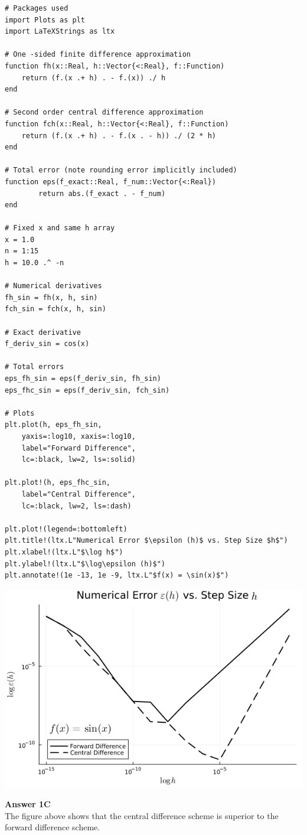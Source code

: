\documentclass{article}
\begin{document}
\begin{verbatim}
# Packages used
import Plots as plt
import LaTeXStrings as ltx

# One -sided finite difference approximation
function fh(x::Real, h::Vector{<:Real}, f::Function)
    return (f.(x .+ h) . - f.(x)) ./ h
end

# Second order central difference approximation
function fch(x::Real, h::Vector{<:Real}, f::Function)
    return (f.(x .+ h) . - f.(x . - h)) ./ (2 * h)
end

# Total error (note rounding error implicitly included)
function eps(f_exact::Real, f_num::Vector{<:Real})
        return abs.(f_exact . - f_num)
end

# Fixed x and same h array
x = 1.0
n = 1:15
h = 10.0 .^ -n

# Numerical derivatives
fh_sin = fh(x, h, sin)
fch_sin = fch(x, h, sin)

# Exact derivative
f_deriv_sin = cos(x)

# Total errors
eps_fh_sin = eps(f_deriv_sin, fh_sin)
eps_fhc_sin = eps(f_deriv_sin, fch_sin)

# Plots
plt.plot(h, eps_fh_sin,
    yaxis=:log10, xaxis=:log10,
    label="Forward Difference",
    lc=:black, lw=2, ls=:solid)

plt.plot!(h, eps_fhc_sin,
    label="Central Difference",
    lc=:black, lw=2, ls=:dash)

plt.plot!(legend=:bottomleft)
plt.title!(ltx.L"Numerical Error $\epsilon (h)$ vs. Step Size $h$")
plt.xlabel!(ltx.L"$\log h$")
plt.ylabel!(ltx.L"$\log\epsilon (h)$")
plt.annotate!(1e -13, 1e -9, ltx.L"$f(x) = \sin(x)$")
\end{verbatim}

\includegraphics[width=0.7\linewidth]{files/1c7bae06802b8646ae520dfa46d49f2d.png}

\begin{framed}
\textbf{Answer 1C}\\
The figure above shows that the central difference scheme is superior to the forward difference scheme.
\end{framed}
\end{document}

